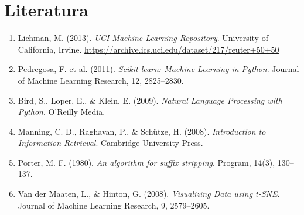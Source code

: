 \documentclass[12pt, a4paper]{article}
\begin{document}
\newpage
\section*{Literatura}

\begin{enumerate}
    \item Lichman, M. (2013). \textit{UCI Machine Learning Repository}.
    University of California, Irvine.
    \url{https://archive.ics.uci.edu/dataset/217/reuter+50+50}

    \item Pedregosa, F. et al. (2011). \textit{Scikit-learn: Machine Learning in Python}.
    Journal of Machine Learning Research, 12, 2825–2830.

    \item Bird, S., Loper, E., \& Klein, E. (2009).
    \textit{Natural Language Processing with Python}.
    O'Reilly Media.

    \item Manning, C. D., Raghavan, P., \& Schütze, H. (2008).
    \textit{Introduction to Information Retrieval}.
    Cambridge University Press.

    \item Porter, M. F. (1980). \textit{An algorithm for suffix stripping}.
    Program, 14(3), 130–137.

    \item Van der Maaten, L., \& Hinton, G. (2008).
    \textit{Visualizing Data using t-SNE}.
    Journal of Machine Learning Research, 9, 2579–2605.
\end{enumerate}
\end{document}
